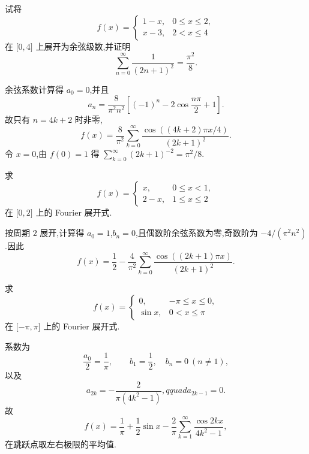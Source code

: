 \begin{example}
    试将
    \[
        f(x)=
        \begin{cases}
            1-x, & 0\leq x\leq2, \\
            x-3, & 2<x\leq4
        \end{cases}
    \]
    在 $\lbrack 0,4\rbrack$ 上展开为余弦级数,并证明
    \[
        \displaystyle\sum\limits_{n=0}^{\infty}\dfrac{1}{(2n+1)^2}=\dfrac{\pi^2}{8}.
    \]
\end{example}
\exampleblank

\begin{solution}
    余弦系数计算得 $a_0=0$,并且
    \[
        a_n=\dfrac{8}{\pi^2n^2}\left[(-1)^n-2\cos\dfrac{n\pi}{2}+1\right].
    \]
    故只有 $n=4k+2$ 时非零,
    \[
        f(x)=\dfrac{8}{\pi^2}\sum\limits_{k=0}^{\infty}
        \dfrac{\cos((4k+2)\pi x/4)}{(2k+1)^2}.
    \]
    令 $x=0$,由 $f(0)=1$ 得
    $\displaystyle\sum_{k=0}^{\infty}(2k+1)^{-2}=\pi^2/8$.
\end{solution}

\begin{example}
    求
    \[
        f(x)=
        \begin{cases}
            x,   & 0\leq x<1,   \\
            2-x, & 1\leq x\leq2
        \end{cases}
    \]
    在 $\lbrack 0,2\rbrack$ 上的 Fourier 展开式.
\end{example}
\exampleblank

\begin{solution}
    按周期 $2$ 展开,计算得 $a_0=1$,$b_n=0$,且偶数阶余弦系数为零,奇数阶为
    $-4/(\pi^2n^2)$.因此
    \[
        f(x)=\dfrac{1}{2}-\dfrac{4}{\pi^2}
        \sum\limits_{k=0}^{\infty}\dfrac{\cos((2k+1)\pi x)}{(2k+1)^2}.
    \]
\end{solution}

\begin{example}
    求
    \[
        f(x)=
        \begin{cases}
            0,      & -\pi\leq x\leq0, \\
            \sin x, & 0<x\leq\pi
        \end{cases}
    \]
    在 $\lbrack -\pi,\pi\rbrack$ 上的 Fourier 展开式.
\end{example}
\exampleblank

\begin{solution}
    系数为
    \[
        \dfrac{a_0}{2}=\dfrac{1}{\pi},\qquad b_1=\dfrac{1}{2},\quad b_n=0\ (n\ne1),
    \]
    以及
    \[
        a_{2k}=-\dfrac{2}{\pi(4k^2-1)},qquad a_{2k-1}=0.
    \]
    故
    \[
        f(x)=\dfrac{1}{\pi}+\dfrac{1}{2}\sin x-
        \dfrac{2}{\pi}\sum\limits_{k=1}^{\infty}\dfrac{\cos2kx}{4k^2-1},
    \]
    在跳跃点取左右极限的平均值.
\end{solution}

